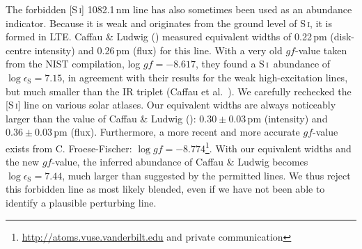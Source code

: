 \documentclass[traditabstract]{aa}
\newcommand{\altsuli}{S\,\textsc{i}}
\newcommand{\suli}{\altsuli\ }
\begin{document}
The forbidden [\altsuli] 1082.1\,nm line has also sometimes been used as an abundance indicator. Because it is weak and originates from the ground level of \altsuli, it is formed in LTE. Caffau \& Ludwig (\cite{caf3}) measured equivalent widths of 0.22\,pm (disk-centre intensity) and 0.26\,pm (flux) for this line. With a very old $gf$-value taken from the NIST compilation, log $gf=-8.617$, they found a \suli abundance of $\log \epsilon_{\mathrm{S}} = 7.15$, in agreement with their results for the weak high-excitation lines, but much smaller than the IR triplet (Caffau et al.\ \cite{caf2}). We carefully rechecked the [\altsuli] line on various solar atlases. Our equivalent widths are always noticeably larger than the value of Caffau \& Ludwig (\cite{caf3}): $0.30 \pm 0.03$\,pm (intensity) and $0.36 \pm 0.03$\,pm (flux). Furthermore, a more recent and more accurate $gf$-value exists from C. Froese-Fischer: $\log gf= -8.774$\footnote{\href{http://atoms.vuse.vanderbilt.edu}{http://atoms.vuse.vanderbilt.edu} and private communication}. With our equivalent widths and the new $gf$-value, the inferred abundance of Caffau \& Ludwig becomes $\log\epsilon_{\mathrm{S}} = 7.44$, much larger than suggested by the permitted lines. We thus reject this forbidden line as most likely blended, even if we have not been able to identify a plausible perturbing line.

\setcounter{table}{4}
\end{document}
